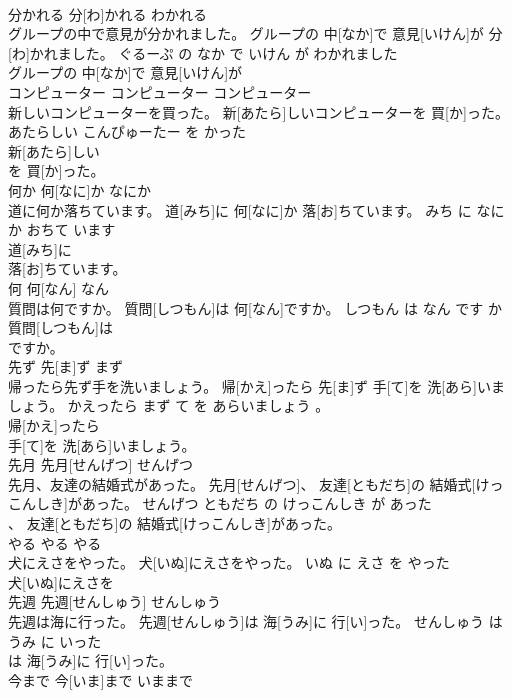 \documentclass[8pt]{extreport}
\begin{document}
\begin{CJK}{UTF8}{min}
\\	分かれる	分[わ]かれる	わかれる	
\\	グループの中で意見が分かれました。	グループの 中[なか]で 意見[いけん]が 分[わ]かれました。	ぐるーぷ の なか で いけん が わかれました	
\\	グループの 中[なか]で 意見[いけん]が
\\	コンピューター	コンピューター	コンピューター	
\\	新しいコンピューターを買った。	新[あたら]しいコンピューターを 買[か]った。	あたらしい こんぴゅーたー を かった	
\\	新[あたら]しい
\\	を 買[か]った。			
\\	何か	何[なに]か	なにか	
\\	道に何か落ちています。	道[みち]に 何[なに]か 落[お]ちています。	みち に なにか おちて います	
\\	道[みち]に
\\	落[お]ちています。			
\\	何	何[なん]	なん	
\\	質問は何ですか。	質問[しつもん]は 何[なん]ですか。	しつもん は なん です か	
\\	質問[しつもん]は
\\	ですか。			
\\	先ず	先[ま]ず	まず	
\\	帰ったら先ず手を洗いましょう。	帰[かえ]ったら 先[ま]ず 手[て]を 洗[あら]いましょう。	かえったら まず て を あらいましょう 。	
\\	帰[かえ]ったら
\\	手[て]を 洗[あら]いましょう。			
\\	先月	先月[せんげつ]	せんげつ	
\\	先月、友達の結婚式があった。	先月[せんげつ]、 友達[ともだち]の 結婚式[けっこんしき]があった。	せんげつ ともだち の けっこんしき が あった	
\\	、 友達[ともだち]の 結婚式[けっこんしき]があった。			
\\	やる	やる	やる	
\\	犬にえさをやった。	犬[いぬ]にえさをやった。	いぬ に えさ を やった	
\\	犬[いぬ]にえさを
\\	先週	先週[せんしゅう]	せんしゅう	
\\	先週は海に行った。	先週[せんしゅう]は 海[うみ]に 行[い]った。	せんしゅう は うみ に いった	
\\	は 海[うみ]に 行[い]った。			
\\	今まで	今[いま]まで	いままで	

\end{CJK}
\end{document}
